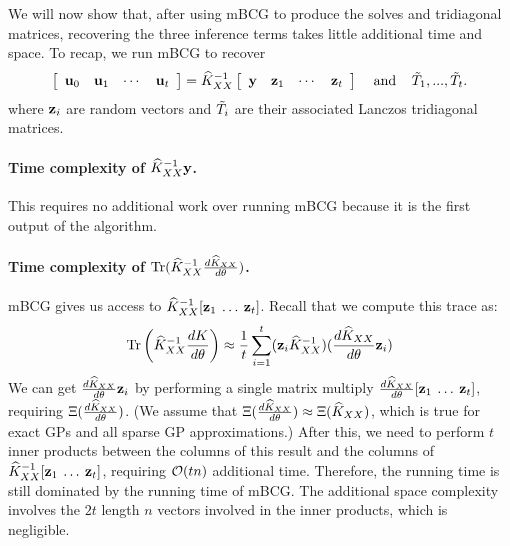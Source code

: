 We will now show that, after using mBCG to produce the solves and tridiagonal matrices, recovering the three inference terms takes little additional time and space.
To recap, we run mBCG to recover
%
\begin{equation*}
  \left[\begin{array}{cccc}\mathbf{u}_{0} & \mathbf{u}_{1} & \cdots & \mathbf{u}_{t}\end{array}\right] = \widehat{K}_{XX}^{-1}\left[\begin{array}{cccc}\mathbf{y} & \mathbf{z}_{1} & \cdots & \mathbf{z}_{t}\end{array}\right] \:\:\:\:\: \text{and} \:\:\:\:\: \tilde{T}_{1},...,\tilde{T}_{t}.
\end{equation*}
%
where $\mathbf{z}_i$ are random vectors and $\tilde {T}_i$ are their associated Lanczos tridiagonal matrices.

\paragraph{Time complexity of $\widehat{K}_{XX}^{-1}\mathbf{y}$.}
This requires no additional work over running mBCG because it is the first output of the algorithm.

\paragraph{Time complexity of $\tr{\trainK^{-1}\frac{d\trainK}{d\theta}}$.}
mBCG gives us access to $\widehat{K}_{XX}^{-1}[\mathbf{z}_{1} \: \ldots \: \mathbf{z}_{t}]$.
Recall that we compute this trace as:
\begin{equation}
  \tr{\trainK^{-1}\frac{dK}{d\theta}} \approx \frac{1}{t}\sum_{i=1}^{t}(\bz_{i}\trainK^{-1})(\frac{d\trainK}{d\theta}\bz_{i})
\end{equation}
We can get $\frac{d\widehat{K}_{XX}}{d\theta}\mathbf{z}_{i}$ by performing a single matrix multiply $\frac{d\widehat{K}_{XX}}{d\theta}[\mathbf{z}_{1} \: \ldots \: \mathbf{z}_{t}]$, requiring $\Xi (\frac{d\widehat{K}_{XX}}{d\theta})$.
(We assume that $\Xi (\frac{d\widehat{K}_{XX}}{d\theta}) \approx \Xi (\widehat{K}_{XX})$, which is true for exact GPs and all sparse GP approximations.)
After this, we need to perform $t$ inner products between the columns of this result and the columns of $\widehat{K}_{XX}^{-1}[\mathbf{z}_{1} \: \ldots \: \mathbf{z}_{t}]$, requiring $\bigo{tn}$ additional time.
Therefore, the running time is still dominated by the running time of mBCG.
The additional space complexity involves the $2t$ length $n$ vectors involved in the inner products, which is negligible.

